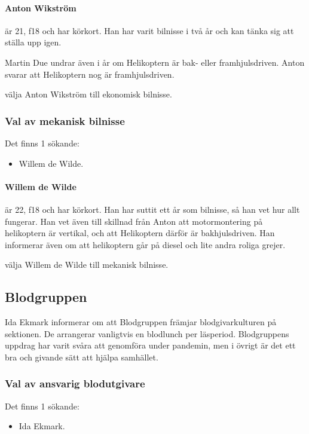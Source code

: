 \documentclass[hidelinks]{sektionsmote}
\begin{document}
\paragraph{Anton Wikström} är 21, f18 och har körkort.
Han har varit bilnisse i två år och kan tänka sig att ställa upp igen.

Martin Due undrar även i år om Helikoptern är bak- eller framhjulsdriven.
Anton svarar att Helikoptern nog är framhjulsdriven.

\begin{beslut}
  \item välja Anton Wikström till ekonomisk bilnisse.
\end{beslut}


\subsubsection{Val av mekanisk bilnisse}
Det finns 1 sökande:
\begin{itemize}
    \item Willem de Wilde.
\end{itemize}

\paragraph{Willem de Wilde} är 22, f18 och har körkort.
Han har suttit ett år som bilnisse, så han vet hur allt fungerar.
Han vet även till skillnad från Anton att motormontering på helikoptern är vertikal, och att Helikoptern därför är bakhjulsdriven.
Han informerar även om att helikoptern går på diesel och lite andra roliga grejer.

\begin{beslut}
  \item välja Willem de Wilde till mekanisk bilnisse.
\end{beslut}


\subsection{Blodgruppen}
Ida Ekmark informerar om att Blodgruppen främjar blodgivarkulturen på sektionen.
De arrangerar vanligtvis en blodlunch per läsperiod.
Blodgruppens uppdrag har varit svåra att genomföra under pandemin, men i övrigt är det ett bra och givande sätt att hjälpa samhället.


\subsubsection{Val av ansvarig blodutgivare}
Det finns 1 sökande:
\begin{itemize}
    \item Ida Ekmark.
\end{itemize}
\end{document}
